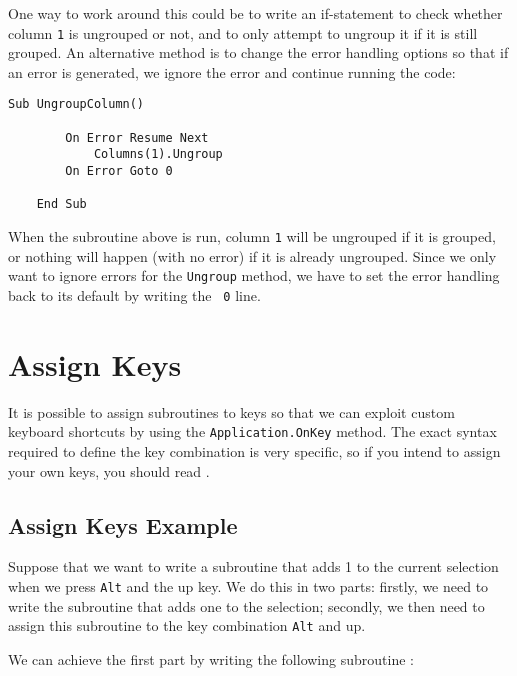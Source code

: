 \documentclass[11pt]{article}%
\begin{document}
One way to work around this could be to write an if-statement to check whether column \texttt{1} is ungrouped or not, and to only attempt to ungroup it if it is still grouped. An alternative method is to change the error handling options so that if an error is generated, we ignore the error and continue running the code:\\

\begin{lstlisting}[style=A]
    Sub UngroupColumn()

        On Error Resume Next
            Columns(1).Ungroup
        On Error Goto 0

    End Sub
\end{lstlisting}

When the subroutine above is run, column \texttt{1} will be ungrouped if it is grouped, or nothing will happen (with no error) if it is already ungrouped. Since we only want to ignore errors for the \texttt{Ungroup} method, we have to set the error handling back to its default by writing the \texttt{ 0} line.


\section{Assign Keys}

It is possible to assign subroutines to keys so that we can exploit custom keyboard shortcuts by using the \texttt{Application.OnKey} method. The exact syntax required to define the key combination is very specific, so if you intend to assign your own keys, you should read \cite{ApplicationOnKey}.


\subsection{Assign Keys Example}

Suppose that we want to write a subroutine that adds 1 to the current selection when we press \texttt{Alt} and the up key. We do this in two parts: firstly, we need to write the subroutine that adds one to the selection; secondly, we then need to assign this subroutine to the key combination \texttt{Alt} and up.

We can achieve the first part by writing the following subroutine \cite{PlusOneToSelection}:\\
\end{document}
